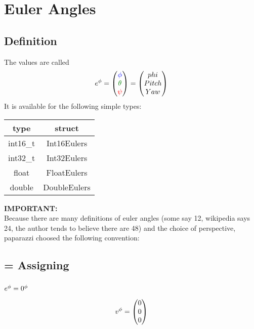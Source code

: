 \section{Euler Angles}
\subsection{Definition}
The values are called
\begin{equation}
\eu{e} = \begin{pmatrix} \Roll \\\Pitch\\\Yaw\\\end{pmatrix} = \begin{pmatrix} phi \\Pitch\\Yaw\\\end{pmatrix}
\end{equation}
It is available for the following simple types:\\
\begin{tabular}{c|c}
type		& struct		\\ \hline
int16\_t	& Int16Eulers	\\
int32\_t	& Int32Eulers	\\
float		& FloatEulers	\\
double		& DoubleEulers
\end{tabular}
\textbf{IMPORTANT:}\label{paparazzi euler definition}\\
Because there are many definitions of euler angles (some say 12, wikipedia says 24, the author tends to believe there are 48) and the choice of perspective, paparazzi choosed the following convention:




\subsection{= Assigning}
\subsubsection*{$\eu{e} = \eu{0}$}
\begin{equation}
\eu v = \begin{pmatrix} 0 \\ 0 \\ 0 \end{pmatrix}
\end{equation}

